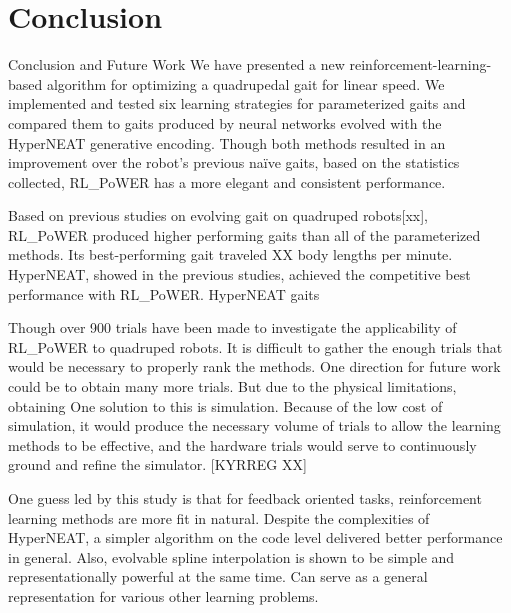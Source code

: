 \section{Conclusion}

Conclusion and Future Work
We have presented a new reinforcement-learning-based algorithm for optimizing a quadrupedal gait for linear speed. We implemented and tested six learning strategies for parameterized gaits and compared them to gaits produced by neural networks evolved with the HyperNEAT generative encoding. Though both methods resulted in an improvement over the robot’s previous naïve gaits, based on the statistics collected, RL_PoWER has a more elegant and consistent performance.

Based on previous studies on evolving gait on quadruped robots[xx], RL_PoWER produced higher performing gaits than all of the parameterized methods. Its best-performing gait traveled XX body lengths per minute.  HyperNEAT, showed in the previous studies, achieved the competitive best performance with RL_PoWER. HyperNEAT gaits

Though over 900 trials have been made to investigate the applicability of RL_PoWER to quadruped robots. It is difficult to gather the enough trials that would be necessary to properly rank the methods. One direction for future work could be to obtain many more trials. But due to the physical limitations, obtaining  One solution to this is simulation. Because of the low cost of simulation, it would produce the necessary volume of trials to allow the learning methods to be effective, and the hardware trials would serve to continuously ground and refine the simulator. [KYRREG XX]

One guess led by this study is that for feedback oriented tasks, reinforcement learning methods are more fit in natural. Despite the complexities of HyperNEAT, a simpler algorithm on the code level delivered better performance in general.  Also, evolvable spline interpolation is shown to be simple and representationally powerful at the same time. Can serve as a general representation for various other learning problems. 
